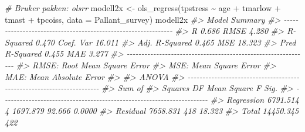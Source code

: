 \documentclass[
]{article}
\newenvironment{Shaded}{\begin{snugshade}}{\end{snugshade}}
\newcommand{\AttributeTok}[1]{\textcolor[rgb]{0.77,0.63,0.00}{#1}}
\newcommand{\CommentTok}[1]{\textcolor[rgb]{0.56,0.35,0.01}{\textit{#1}}}
\newcommand{\FunctionTok}[1]{\textcolor[rgb]{0.00,0.00,0.00}{#1}}
\newcommand{\NormalTok}[1]{#1}
\newcommand{\OtherTok}[1]{\textcolor[rgb]{0.56,0.35,0.01}{#1}}
\newcommand{\SpecialCharTok}[1]{\textcolor[rgb]{0.00,0.00,0.00}{#1}}
\begin{document}
\begin{Shaded}
\begin{Highlighting}[]
\CommentTok{\# Bruker pakken: olsrr}
\NormalTok{modell2x }\OtherTok{\textless{}{-}} \FunctionTok{ols\_regress}\NormalTok{(tpstress }\SpecialCharTok{\textasciitilde{}}\NormalTok{ age }\SpecialCharTok{+}\NormalTok{ tmarlow }\SpecialCharTok{+}\NormalTok{ tmast }\SpecialCharTok{+}\NormalTok{ tpcoiss, }\AttributeTok{data =}\NormalTok{ Pallant\_survey)}
\NormalTok{modell2x}
\CommentTok{\#\textgreater{}                         Model Summary                          }
\CommentTok{\#\textgreater{} {-}{-}{-}{-}{-}{-}{-}{-}{-}{-}{-}{-}{-}{-}{-}{-}{-}{-}{-}{-}{-}{-}{-}{-}{-}{-}{-}{-}{-}{-}{-}{-}{-}{-}{-}{-}{-}{-}{-}{-}{-}{-}{-}{-}{-}{-}{-}{-}{-}{-}{-}{-}{-}{-}{-}{-}{-}{-}{-}{-}{-}{-}}
\CommentTok{\#\textgreater{} R                       0.686       RMSE                4.280 }
\CommentTok{\#\textgreater{} R{-}Squared               0.470       Coef. Var          16.011 }
\CommentTok{\#\textgreater{} Adj. R{-}Squared          0.465       MSE                18.323 }
\CommentTok{\#\textgreater{} Pred R{-}Squared          0.455       MAE                 3.277 }
\CommentTok{\#\textgreater{} {-}{-}{-}{-}{-}{-}{-}{-}{-}{-}{-}{-}{-}{-}{-}{-}{-}{-}{-}{-}{-}{-}{-}{-}{-}{-}{-}{-}{-}{-}{-}{-}{-}{-}{-}{-}{-}{-}{-}{-}{-}{-}{-}{-}{-}{-}{-}{-}{-}{-}{-}{-}{-}{-}{-}{-}{-}{-}{-}{-}{-}{-}}
\CommentTok{\#\textgreater{}  RMSE: Root Mean Square Error }
\CommentTok{\#\textgreater{}  MSE: Mean Square Error }
\CommentTok{\#\textgreater{}  MAE: Mean Absolute Error }
\CommentTok{\#\textgreater{} }
\CommentTok{\#\textgreater{}                                 ANOVA                                  }
\CommentTok{\#\textgreater{} {-}{-}{-}{-}{-}{-}{-}{-}{-}{-}{-}{-}{-}{-}{-}{-}{-}{-}{-}{-}{-}{-}{-}{-}{-}{-}{-}{-}{-}{-}{-}{-}{-}{-}{-}{-}{-}{-}{-}{-}{-}{-}{-}{-}{-}{-}{-}{-}{-}{-}{-}{-}{-}{-}{-}{-}{-}{-}{-}{-}{-}{-}{-}{-}{-}{-}{-}{-}{-}{-}}
\CommentTok{\#\textgreater{}                  Sum of                                               }
\CommentTok{\#\textgreater{}                 Squares         DF    Mean Square      F         Sig. }
\CommentTok{\#\textgreater{} {-}{-}{-}{-}{-}{-}{-}{-}{-}{-}{-}{-}{-}{-}{-}{-}{-}{-}{-}{-}{-}{-}{-}{-}{-}{-}{-}{-}{-}{-}{-}{-}{-}{-}{-}{-}{-}{-}{-}{-}{-}{-}{-}{-}{-}{-}{-}{-}{-}{-}{-}{-}{-}{-}{-}{-}{-}{-}{-}{-}{-}{-}{-}{-}{-}{-}{-}{-}{-}{-}}
\CommentTok{\#\textgreater{} Regression     6791.514          4       1697.879    92.666    0.0000 }
\CommentTok{\#\textgreater{} Residual       7658.831        418         18.323                     }
\CommentTok{\#\textgreater{} Total         14450.345        422                                    }

\end{Highlighting}
\end{Shaded}
\end{document}

